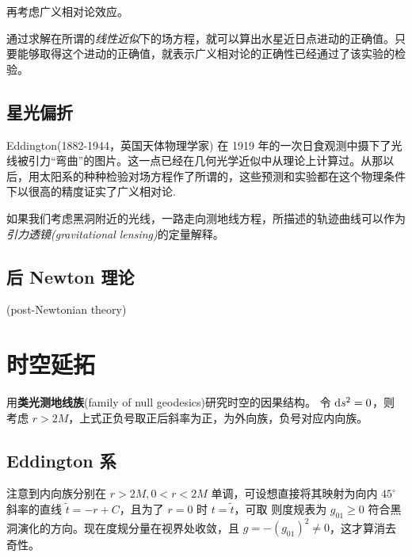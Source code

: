 再考虑广义相对论效应。

通过求解在所谓的\textit{线性近似}下的场方程，就可以算出水星近日点进动的正确值。只要能够取得这个进动的正确值，就表示广义相对论的正确性已经通过了该实验的检验。



\subsection{星光偏折}
Eddington(1882-1944，英国天体物理学家) 在 1919 年的一次日食观测中摄下了光线被引力“弯曲”的图片。这一点已经在几何光学近似中从理论上计算过。从那以后，用太阳系的种种检验对场方程作了所谓的，这些预测和实验都在这个物理条件下以很高的精度证实了广义相对论.

如果我们考虑黑洞附近的光线，一路走向测地线方程，所描述的轨迹曲线可以作为\textit{引力透镜(gravitational lensing)}的定量解释。

\subsection{后 Newton 理论}

(post-Newtonian theory)

\section{时空延拓}

用\textbf{类光测地线族}(family of null geodesics)研究时空的因果结构。
令 $\dd s^2=0$，则
考虑 $r>2M$，上式正负号取正后斜率为正，为外向族，负号对应内向族。

\subsection{Eddington 系}

注意到内向族分别在 $r>2M,0<r<2M$ 单调，可设想直接将其映射为向内 $45^\circ$ 斜率的直线 $\tilde t=-r+C$，且为了 $r=0$ 时 $t=\tilde t$，可取
则度规表为
$g_{01}\geqslant 0$ 符合黑洞演化的方向。现在度规分量在视界处收敛，且 $g=-(g_{01})^2\ne 0$，这才算消去奇性。


